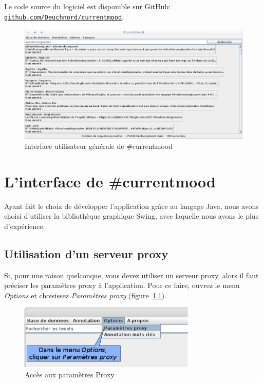 \documentclass[12pt,a4paper]{report}
\newcommand{\CMName}{\#currentmood}
\begin{document}
Le code source du logiciel est disponible sur GitHub:
\texttt{\href{http://github.com/Deuchnord/currentmood}{github.com/Deuchnord/currentmood}}.

\begin{figure}
	\includegraphics[width=\textwidth]{img/capture-currentmood-ui.png}
	\caption{Interface utilisateur générale de \CMName}
\label{cm_ui}
\end{figure}


\chapter{L'interface de \CMName}
Ayant fait le choix de développer l'application grâce au langage Java, nous
avons choisi d'utiliser la bibliothèque graphique Swing, avec laquelle nous
avons le plus d’expérience.

\section{Utilisation d'un serveur proxy}
Si, pour une raison quelconque, vous devez utiliser un serveur proxy, alors il
faut préciser les paramètres proxy à l'application. Pour ce faire, ouvrez le
menu \textit{Options} et choisissez \textit{Paramètres proxy}
(figure~\ref{capture_menuproxy}).

\begin{figure}
	\centering
	\includegraphics[width=0.75\textwidth]{img/capture_menuproxy.eps}
	\caption{Accès aux paramètres Proxy}
\label{capture_menuproxy}
\end{figure}
\end{document}
